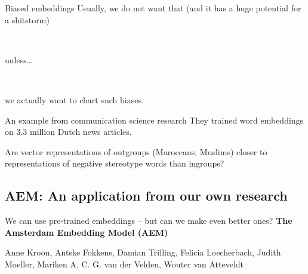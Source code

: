 \begin{frame}{Biased embeddings}
  Usually, we do not want that (and it has a huge potential for a shitstorm)
  
  ~\\
  \pause
  
	unless\ldots
	
	~\\
	\pause
	
	we actually want to chart such biases.
	
\end{frame}


\begin{frame}{An example from communication science research \parencite{Kroon2021}}
	They trained word embeddings on 3.3 million Dutch news articles.
	
	Are vector representations of outgroups (Maroccans, Muslims) closer to representations of negative stereotype words than ingroups?

\end{frame}


\begin{frame}[plain]
	
\end{frame}


\subsection[AEM]{AEM: An application from our own research}

\begin{frame}[plain]
	We can use pre-trained embeddings -- but can we make even better ones?
	\textbf{The Amsterdam Embedding Model (AEM)}\\
	
	
	\vspace{1cm}
	
	{\footnotesize{Anne Kroon, Antske Fokkens, Damian Trilling, Felicia Loecherbach, Judith Moeller, Mariken A. C. G. van der Velden, Wouter van Atteveldt} }
\end{frame}





